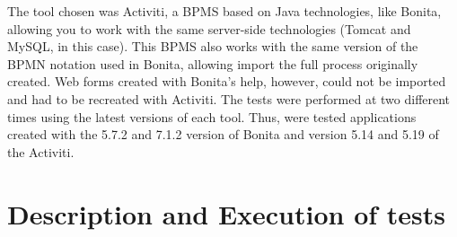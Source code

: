 \documentclass[runningheads,a4paper]{llncs}
\begin{document}
The tool chosen was Activiti, a BPMS based on Java technologies, like Bonita, allowing you to work with the same server-side technologies (Tomcat and MySQL, in this case). This BPMS also works with the same version of the BPMN notation used in Bonita, allowing import the full process originally created. Web forms created with Bonita's help, however, could not be imported and had to be recreated with Activiti. The tests were performed at two different times using the latest versions of each tool. Thus, were tested applications created with the 5.7.2 and 7.1.2 version of Bonita and version  5.14 and 5.19 of the Activiti. 

\section{Description and Execution of tests}\label{s:testes}
\end{document}

